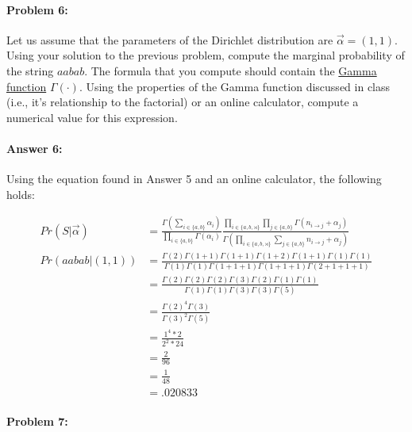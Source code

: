 \documentclass[10pt]{article}
\begin{document}
\hrulefill
\paragraph{Problem 6:}

Let us assume that the parameters of the Dirichlet distribution are
$\vec{\alpha} = (1,1)$. Using your solution to the previous problem,
compute the marginal probability of the string $aabab$. The formula
that you compute should contain the
\href{https://en.wikipedia.org/wiki/Gamma_function}{Gamma function}
$\Gamma(\cdot)$. Using the properties of the Gamma function discussed
in class (i.e., it's relationship to the factorial) or an online
calculator, compute a numerical value for this expression.


\paragraph{Answer 6:} Using the equation found in Answer 5 and an online calculator, the following holds:

\begin{equation*}
    \begin{split}
        Pr(S | \vec{\alpha}) &=\frac{\Gamma(\sum_{i \in \{a,b\}} \alpha_i)}{\prod_{i \in \{a,b\}}\Gamma (\alpha_i)} \frac{\prod_{i\in\{a,b,\rtimes\}}\prod_{j\in\{a,b\}}\Gamma(n_{i \rightarrow j} + \alpha_{j})}{\Gamma( \prod_{i \in \{a,b,\rtimes\}}\sum_{j \in \{a,b\}} n_{i \rightarrow j} + \alpha_{j})}\\
        Pr(aabab | (1,1)) 
        &= \frac{\Gamma(2)\Gamma(1+1)\Gamma(1+1)\Gamma(1+2)\Gamma(1+1) \Gamma(1)\Gamma(1)}{\Gamma(1)\Gamma(1)\Gamma(1+1+1)\Gamma(1+1+1)\Gamma(2+1+1+1)}\\
        &= \frac{\Gamma(2)\Gamma(2)\Gamma(2)\Gamma(3)\Gamma(2)\Gamma(1)\Gamma(1)}{\Gamma(1) \Gamma(1)\Gamma(3)\Gamma(3)\Gamma(5)}\\
        &= \frac{\Gamma(2)^4\Gamma(3)}{\Gamma(3)^2\Gamma(5)}\\
        &= \frac{1^4*2}{2^2*24}\\
        &= \frac{2}{96}\\
        &= \frac{1}{48}\\
        &= .020833
    \end{split}
\end{equation*}

\hrulefill
\paragraph{Problem 7:}
\end{document}
